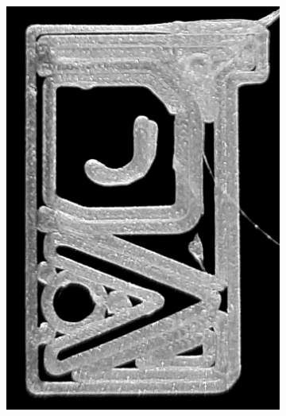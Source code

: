 \begin{figure}
\centering
\setlength{\figheight}{.38\columnwidth}
\setlength{\figheightTwo}{.47\columnwidth}
\setlength{\figwidth}{0.32\columnwidth}
\begin{subfigure}{\figwidth}\centering
\includegraphics[height=\figheightTwo]{sources/applications/gMAT_naive.png}

\end{subfigure}
\end{figure}
